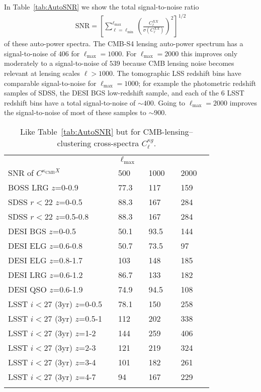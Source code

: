 \documentclass[prd,superscriptaddress,floatfix,notitlepage,nofootinbib,reprint]{revtex4-1} %
\begin{document}
In Table~\ref{tab:AutoSNR} we show the total signal-to-noise ratio 
\begin{align}
  \label{eq:10}
  \mathrm{SNR} = 
\left[\sum_{\ell=\ell_\mathrm{min}}^{\ell_\mathrm{max}} \left(\frac{C^{XX}_\ell}{\sigma(C^{XX}_\ell)}\right)^2\right]^{1/2}
\end{align}
of these auto-power spectra.
The CMB-S4 lensing auto-power spectrum has a signal-to-noise of $406$ for $\ell_\mathrm{max}=1000$. For $\ell_\mathrm{max}=2000$ this improves only moderately to a signal-to-noise of $539$ because CMB lensing noise becomes relevant at lensing scales $\ell>1000$.
The tomographic LSS redshift bins have comparable signal-to-noise for $\ell_\mathrm{max}=1000$; for example the photometric redshift samples of SDSS, the DESI BGS low-redshift sample, and each of the 6 LSST redshift bins have a total signal-to-noise of $\sim 400$.
Going to $\ell_\mathrm{max}=2000$ improves the signal-to-noise of most of these samples to $\sim 900$.

\begin{table}[tbp]
\centering
\renewcommand{\arraystretch}{1.0}
\begin{tabular}{@{}p{4.0cm}lllllll@{}}
\toprule
 & \phantom{} & \multicolumn{5}{l}{$\ell_\mathrm{max}$}  \\ 
SNR of $C^{\kappa_\mathrm{CMB}X}$ &&  500  &\phantom{$\,$}&  1000  &\phantom{$\,$}&  2000 \\ 
\colrule 
BOSS LRG $z$=0-0.9  && 77.3 && 117 && 159 \\
SDSS $r<22$ $z$=0-0.5  && 88.3 && 167 && 284 \\
SDSS $r<22$ $z$=0.5-0.8  && 88.3 && 167 && 284 \\
DESI BGS $z$=0-0.5  && 50.1 && 93.5 && 144 \\
DESI ELG $z$=0.6-0.8  && 50.7 && 73.5 && 97 \\
DESI ELG $z$=0.8-1.7  && 103 && 148 && 185 \\
DESI LRG $z$=0.6-1.2  && 86.7 && 133 && 182 \\
DESI QSO $z$=0.6-1.9  && 74.9 && 94.5 && 108 \\
LSST $i<27$ (3yr) $z$=0-0.5  && 78.1 && 150 && 258 \\
LSST $i<27$ (3yr) $z$=0.5-1  && 112 && 202 && 338 \\
LSST $i<27$ (3yr) $z$=1-2  && 144 && 259 && 406 \\
LSST $i<27$ (3yr) $z$=2-3  && 121 && 219 && 324 \\
LSST $i<27$ (3yr) $z$=3-4  && 101 && 182 && 261 \\
LSST $i<27$ (3yr) $z$=4-7  && 94 && 167 && 229 \\
\botrule
\end{tabular}
\caption{Like Table~\ref{tab:AutoSNR} but for CMB-lensing--clustering cross-spectra $C^{\kappa g}_\ell$.}
\label{tab:CrossSNR}
\end{table}
\end{document}

